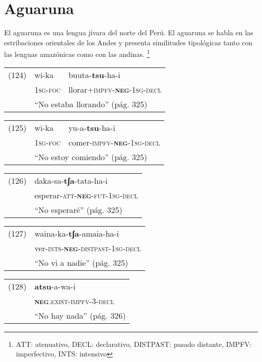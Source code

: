\section*{Aguaruna}

\noindent El aguaruna es una lengua jívara del norte del Perú. El aguaruna se habla en las estribaciones orientales de los Andes y presenta similitudes tipológicas tanto con las lenguas amazónicas como con las andinas.
\footnote{ATT: atenuativo, DECL: declarativo, DISTPAST: pasado distante, IMPFV: imperfectivo, INTS: intensivo}
\vspace{0.5cm}

{\setmainfont{Charis SIL} 

\begin{tabular}{lll}
(124) & wi-ka & buuta-\textbf{tsu}-ha-i  \\
& \textsc{1sg-foc} & llorar+\textsc{impfv-\textbf{neg}-1sg-decl} \\
& \multicolumn{2}{l}{``No estaba llorando'' (pág. 325)}
\end{tabular} \vspace{0.5cm}

\begin{tabular}{lll}
(125) & wi-ka & yu-a-\textbf{tsu}-ha-i \\
& \textsc{1sg-foc} & comer-\textsc{impfv-\textbf{neg}-1sg-decl} \\
& \multicolumn{2}{l}{``No estoy comiendo'' (pág. 325)}
\end{tabular} \vspace{0.5cm}

\begin{tabular}{ll}
(126) & daka-sa-\textbf{tʃa}-tata-ha-i \\
& esperar-\textsc{att-\textbf{neg}-fut-1sg-decl} \\
& ``No esperaré'' (pág. 325)
\end{tabular} \vspace{0.5cm}

\begin{tabular}{ll}
(127) & waina-ka-\textbf{tʃa}-amaia-ha-i \\
& ver-\textsc{ints-\textbf{neg}-distpast-1sg-decl} \\
& ``No vi a nadie'' (pág. 325)
\end{tabular} \vspace{0.5cm}

\begin{tabular}{ll}
(128) & \textbf{atsu}-a-wa-i \\
& \textsc{\textbf{neg}.exist-impfv-3-decl} \\
& ``No hay nada'' (pág. 326)
\end{tabular} \vspace{0.5cm}

}

